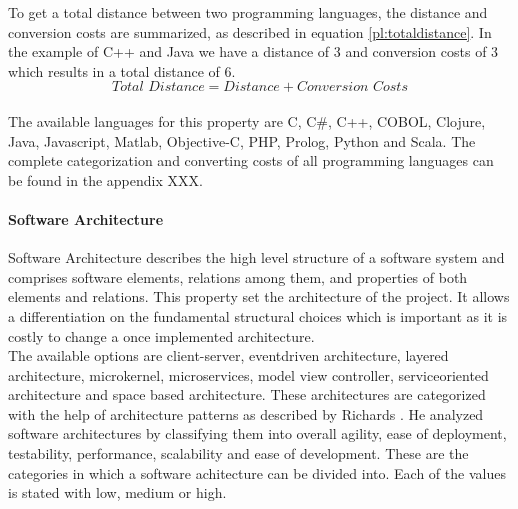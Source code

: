 To get a total distance between two programming languages, the distance and conversion costs are summarized, as described in equation \ref{pl:totaldistance}. In the example of C++ and Java we have a distance of 3 and conversion costs of 3 which results in a total distance of 6.
\begin{equation}
\textit{Total Distance} = \textit{Distance} + \textit{Conversion Costs}\label{pl:totaldistance}
\end{equation}\\
The available languages for this property are C, C\#, C++, COBOL, Clojure, Java, Javascript, Matlab, Objective-C, PHP, Prolog, Python and Scala. The complete categorization and converting costs of all programming languages can be found in the appendix XXX.

\paragraph*{\textbf{Software Architecture}}
Software Architecture describes the high level structure of a software system and comprises software elements, relations among them, and properties of both elements and relations. This property set the architecture of the project. It allows a differentiation on the fundamental structural choices which is important as it is costly to change a once implemented architecture.\\
The available options are client-server, eventdriven architecture, layered architecture, microkernel, microservices, model view controller, serviceoriented architecture and space based architecture. These architectures are categorized with the help of architecture patterns as described by Richards \cite{archpatterns}. He analyzed software architectures by classifying them into overall agility, ease of deployment, testability, performance, scalability and ease of development. These are the categories in which a software achitecture can be divided into. Each of the values is stated with low, medium or high.\\

